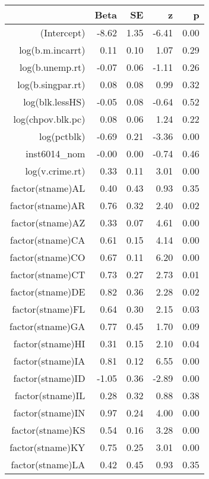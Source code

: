 \begin{table}[ht]
\centering
\begin{tabular}{rrrrr}
  \hline
 & Beta & SE & z & p \\ 
  \hline
(Intercept) & -8.62 & 1.35 & -6.41 & 0.00 \\ 
  log(b.m.incarrt) & 0.11 & 0.10 & 1.07 & 0.29 \\ 
  log(b.unemp.rt) & -0.07 & 0.06 & -1.11 & 0.26 \\ 
  log(b.singpar.rt) & 0.08 & 0.08 & 0.99 & 0.32 \\ 
  log(blk.lessHS) & -0.05 & 0.08 & -0.64 & 0.52 \\ 
  log(chpov.blk.pc) & 0.08 & 0.06 & 1.24 & 0.22 \\ 
  log(pctblk) & -0.69 & 0.21 & -3.36 & 0.00 \\ 
  inst6014\_nom & -0.00 & 0.00 & -0.74 & 0.46 \\ 
  log(v.crime.rt) & 0.33 & 0.11 & 3.01 & 0.00 \\ 
  factor(stname)AL & 0.40 & 0.43 & 0.93 & 0.35 \\ 
  factor(stname)AR & 0.76 & 0.32 & 2.40 & 0.02 \\ 
  factor(stname)AZ & 0.33 & 0.07 & 4.61 & 0.00 \\ 
  factor(stname)CA & 0.61 & 0.15 & 4.14 & 0.00 \\ 
  factor(stname)CO & 0.67 & 0.11 & 6.20 & 0.00 \\ 
  factor(stname)CT & 0.73 & 0.27 & 2.73 & 0.01 \\ 
  factor(stname)DE & 0.82 & 0.36 & 2.28 & 0.02 \\ 
  factor(stname)FL & 0.64 & 0.30 & 2.15 & 0.03 \\ 
  factor(stname)GA & 0.77 & 0.45 & 1.70 & 0.09 \\ 
  factor(stname)HI & 0.31 & 0.15 & 2.10 & 0.04 \\ 
  factor(stname)IA & 0.81 & 0.12 & 6.55 & 0.00 \\ 
  factor(stname)ID & -1.05 & 0.36 & -2.89 & 0.00 \\ 
  factor(stname)IL & 0.28 & 0.32 & 0.88 & 0.38 \\ 
  factor(stname)IN & 0.97 & 0.24 & 4.00 & 0.00 \\ 
  factor(stname)KS & 0.54 & 0.16 & 3.28 & 0.00 \\ 
  factor(stname)KY & 0.75 & 0.25 & 3.01 & 0.00 \\ 
  factor(stname)LA & 0.42 & 0.45 & 0.93 & 0.35 \\ 

\end{tabular}
\end{table}
